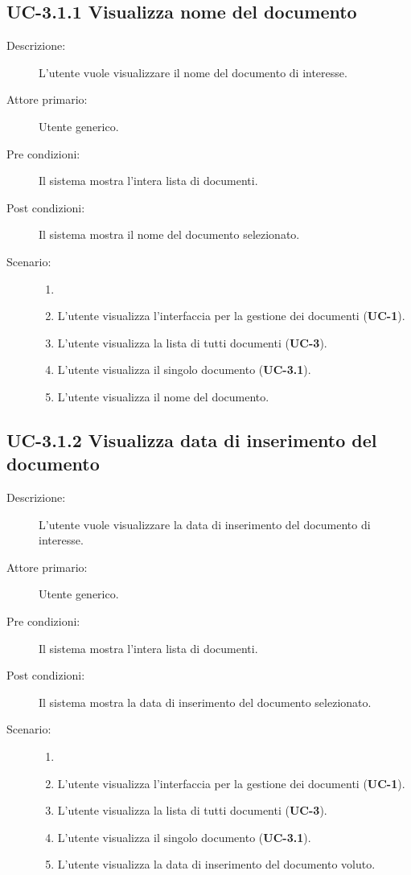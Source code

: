 \subsection{UC-3.1.1 Visualizza nome del documento}
\begin{description}
    \item[Descrizione:] L'utente vuole visualizzare il nome del documento di interesse.
    \item[Attore primario:] Utente generico.
    \item[Pre condizioni:] Il sistema mostra l’intera lista di documenti.
    \item[Post condizioni:] Il sistema mostra il nome del documento selezionato.
    \item[Scenario:]
    \begin{enumerate}
        \item[] 
        \item L’utente visualizza l'interfaccia per la gestione dei documenti (\textbf{UC-1}).
        \item L’utente visualizza la lista di tutti documenti (\textbf{UC-3}).
        \item L'utente visualizza il singolo documento (\textbf{UC-3.1}).
        \item L'utente visualizza il nome del documento.
    \end{enumerate} 
\end{description}

\subsection{UC-3.1.2 Visualizza data di inserimento del documento}
\begin{description}
    \item[Descrizione:] L'utente vuole visualizzare la data di inserimento del documento di interesse.
    \item[Attore primario:] Utente generico.
    \item[Pre condizioni:] Il sistema mostra l’intera lista di documenti.
    \item[Post condizioni:] Il sistema mostra la data di inserimento del documento selezionato.
    \item[Scenario:] 
    \begin{enumerate}
        \item[] 
        \item L’utente visualizza l'interfaccia per la gestione dei documenti (\textbf{UC-1}).
        \item L’utente visualizza la lista di tutti documenti (\textbf{UC-3}).
        \item L'utente visualizza il singolo documento (\textbf{UC-3.1}).
        \item L'utente visualizza la data di inserimento del documento voluto.
    \end{enumerate}
\end{description}

